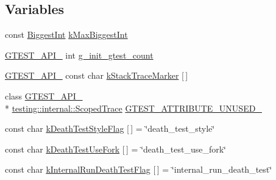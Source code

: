 \subsection*{Variables}
\begin{DoxyCompactItemize}
\item 
const \hyperlink{namespacetesting_1_1internal_a05c6bd9ede5ccdf25191a590d610dcc6}{Biggest\-Int} \hyperlink{namespacetesting_1_1internal_ad901880198832bc166d2493096b451f7}{k\-Max\-Biggest\-Int}
\item 
\hyperlink{ts__gtest_8h_aa73be6f0ba4a7456180a94904ce17790}{G\-T\-E\-S\-T\-\_\-\-A\-P\-I\-\_\-} int \hyperlink{namespacetesting_1_1internal_ac2e10dd08851d714ed2cc52e0b0d72b9}{g\-\_\-init\-\_\-gtest\-\_\-count}
\item 
\hyperlink{ts__gtest_8h_aa73be6f0ba4a7456180a94904ce17790}{G\-T\-E\-S\-T\-\_\-\-A\-P\-I\-\_\-} const char \hyperlink{namespacetesting_1_1internal_a999c7ef9ff01b6d2d76669372c444aa3}{k\-Stack\-Trace\-Marker} \mbox{[}$\,$\mbox{]}
\item 
class \hyperlink{ts__gtest_8h_aa73be6f0ba4a7456180a94904ce17790}{G\-T\-E\-S\-T\-\_\-\-A\-P\-I\-\_\-} \\*
\hyperlink{classtesting_1_1internal_1_1ScopedTrace}{testing\-::internal\-::\-Scoped\-Trace} \hyperlink{namespacetesting_1_1internal_a09251adf471f681a1bc1ab0d53fb70cf}{G\-T\-E\-S\-T\-\_\-\-A\-T\-T\-R\-I\-B\-U\-T\-E\-\_\-\-U\-N\-U\-S\-E\-D\-\_\-}
\item 
const char \hyperlink{namespacetesting_1_1internal_a008ebfe0c0347d65e5e06e4d310981b3}{k\-Death\-Test\-Style\-Flag} \mbox{[}$\,$\mbox{]} = \char`\"{}death\-\_\-test\-\_\-style\char`\"{}
\item 
const char \hyperlink{namespacetesting_1_1internal_a32051e2574562b548be3e26a52eaa553}{k\-Death\-Test\-Use\-Fork} \mbox{[}$\,$\mbox{]} = \char`\"{}death\-\_\-test\-\_\-use\-\_\-fork\char`\"{}
\item 
const char \hyperlink{namespacetesting_1_1internal_a8572303d929880adf30db00952e1c45d}{k\-Internal\-Run\-Death\-Test\-Flag} \mbox{[}$\,$\mbox{]} = \char`\"{}internal\-\_\-run\-\_\-death\-\_\-test\char`\"{}
\end{DoxyCompactItemize}


